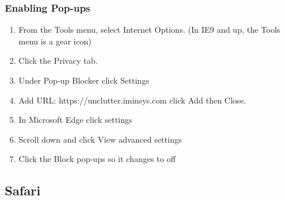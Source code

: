 \documentclass[hidelinks,english]{article}
\begin{document}
            \subsubsection{Enabling Pop-ups}
            \begin{enumerate}
                \item From the Tools menu, select Internet Options. (In IE9 and up, the Tools menu is a gear icon)
                \item Click the Privacy tab.
                \item Under Pop-up Blocker click Settings
                \item Add URL: https://unclutter.iminsys.com click Add then Close.
                \item In Microsoft Edge click settings
                \item Scroll down and click View advanced settings
                \item Click the Block pop-ups so it changes to off
                
            \end{enumerate}
            \begin{center}
            \end{center}
        \newpage
        \subsection{Safari}
\end{document}
